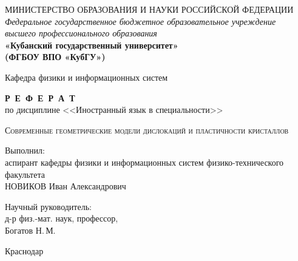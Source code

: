 \documentclass[a4paper, 14pt, titlepage]{extarticle}
\author{\theauthor,\\ кафедра физики и информационных систем КубГУ,\\ направление аспирантуры 01.04.10}
\title{\thetitle}
\date{\today{} \currenttime}
\newcommand{\thetitle}{Современные геометрические модели дислокаций и пластичности кристаллов}
\begin{document}

  \thispagestyle{empty}
  \begin{center}
  \begin{spacing}{1.0}
  {\small МИНИСТЕРСТВО ОБРАЗОВАНИЯ И НАУКИ РОССИЙСКОЙ ФЕДЕРАЦИИ\\
  \textit{Федеральное государственное бюджетное образовательное учреждение\\
  высшего профессионального образования}}\\
  \textbf{\large«Кубанский государственный университет»\\
  (ФГБОУ ВПО «КубГУ»)}

  \vspace {5mm}

  Кафедра физики и информационных систем

  \vspace {4cm}

  \textbf{\large Р~Е~Ф~Е~Р~А~Т}\\
  по дисциплине <<Иностранный язык в специальности>>

  \vspace {0.5cm}

  { \scshape \thetitle }

  \vspace {1.5cm}

  \hfill\begin{minipage}{0.63\textwidth}
    Выполнил:\\
    аспирант кафедры физики и информационных систем
    физико-технического факультета\\
    НОВИКОВ Иван Александрович
    \vspace{1cm}

    Научный руководитель:\\
    д-р физ.-мат. наук, профессор,\\
    Богатов Н.\,М.
  \end{minipage}

  \vfill

  Краснодар \the\year
  \end{spacing}
  \end{center}


    \clearpage
    \tableofcontents

\end{document}
